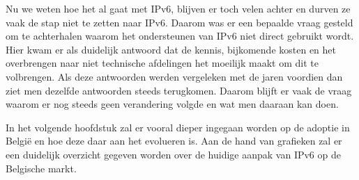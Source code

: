 Nu we weten hoe het al gaat met IPv6, blijven er toch velen achter en durven ze vaak de stap niet te zetten naar IPv6. Daarom was er een bepaalde vraag gesteld om te achterhalen waarom het ondersteunen van IPv6 niet direct gebruikt wordt. Hier kwam er als duidelijk antwoord dat de kennis, bijkomende kosten en het overbrengen naar niet technische afdelingen het moeilijk maakt om dit te volbrengen. Als deze antwoorden werden vergeleken met de jaren voordien dan ziet men dezelfde antwoorden steeds terugkomen. Daarom blijft er vaak de vraag waarom er nog steeds geen verandering volgde en wat men daaraan kan doen.

In het volgende hoofdstuk zal er vooral dieper ingegaan worden op de adoptie in België en hoe deze daar aan het evolueren is. Aan de hand van grafieken zal er een duidelijk overzicht gegeven worden over de huidige aanpak van IPv6 op de Belgische markt.




